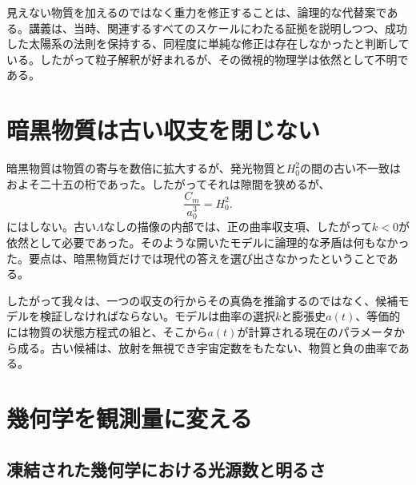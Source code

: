 見えない物質を加えるのではなく重力を修正することは、論理的な代替案である。講義は、当時、関連するすべてのスケールにわたる証拠を説明しつつ、成功した太陽系の法則を保持する、同程度に単純な修正は存在しなかったと判断している。したがって粒子解釈が好まれるが、その微視的物理学は依然として不明である。

\section{暗黒物質は古い収支を閉じない}

暗黒物質は物質の寄与を数倍に拡大するが、発光物質と\(H_0^2\)の間の古い不一致はおよそ二十五の桁であった。したがってそれは隙間を狭めるが、
\begin{equation}
\frac{C_m}{a_0^3}=H_0^2.
\end{equation}
にはしない。古い\(\Lambda\)なしの描像の内部では、正の曲率収支項、したがって\(k<0\)が依然として必要であった。そのような開いたモデルに論理的な矛盾は何もなかった。要点は、暗黒物質だけでは現代の答えを選び出さなかったということである。

\begin{classroomqa}
\end{classroomqa}

したがって我々は、一つの収支の行からその真偽を推論するのではなく、候補モデルを検証しなければならない。モデルは曲率の選択\(k\)と膨張史\(a(t)\)、等価的には物質の状態方程式の組と、そこから\(a(t)\)が計算される現在のパラメータから成る。古い候補は、放射を無視でき宇宙定数をもたない、物質と負の曲率である。

\section{幾何学を観測量に変える}

\subsection{凍結された幾何学における光源数と明るさ}

